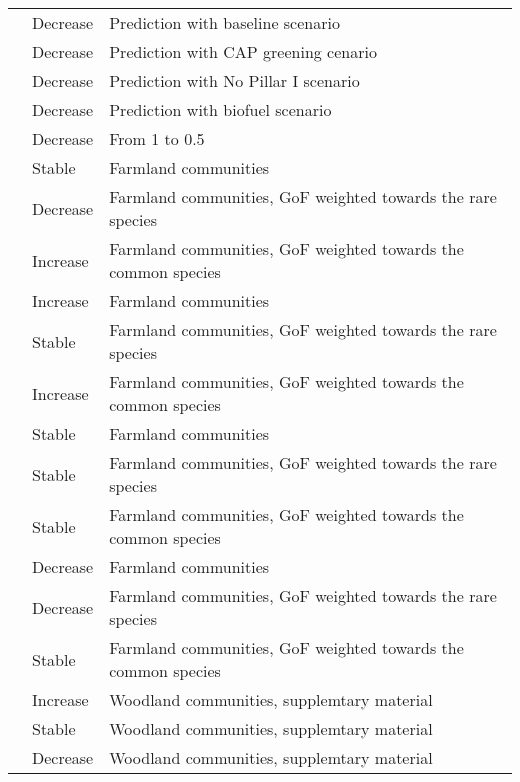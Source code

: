 \documentclass[
  12pt,
  oneside]{report}
\begin{document}
\begin{landscape}
\begin{longtable}[t]{ll>{\raggedright\arraybackslash}p{40em}}
\cite{chiron_forecasting_2013} & Decrease & Prediction with baseline scenario\\
\addlinespace
\cite{chiron_forecasting_2013} & Decrease & Prediction with CAP greening cenario\\
\cite{chiron_forecasting_2013} & Decrease & Prediction with No Pillar I scenario\\
\cite{chiron_forecasting_2013} & Decrease & Prediction with biofuel scenario\\
\cite{eglington_disentangling_2012} & Decrease & From 1 to 0.5\\
\cite{harrison_assessing_2014} & Stable & Farmland \vphantom{1} communities\\
\addlinespace
\cite{harrison_assessing_2014} & Decrease & Farmland communities, GoF weighted towards the rare \vphantom{1} species\\
\cite{harrison_assessing_2014} & Increase & Farmland communities, GoF weighted towards the common \vphantom{1} species\\
\cite{harrison_assessing_2014} & Increase & Farmland communities\\
\cite{harrison_assessing_2014} & Stable & Farmland communities, GoF weighted towards the rare \vphantom{1} species\\
\cite{harrison_assessing_2014} & Increase & Farmland communities, GoF weighted towards the common species\\
\addlinespace
\cite{harrison_assessing_2014} & Stable & Farmland communities\\
\cite{harrison_assessing_2014} & Stable & Farmland communities, GoF weighted towards the rare species\\
\cite{harrison_assessing_2014} & Stable & Farmland communities, GoF weighted towards the common \vphantom{1} species\\
\cite{harrison_assessing_2014} & Decrease & Farmland communities\\
\cite{harrison_assessing_2014} & Decrease & Farmland communities, GoF weighted towards the rare species\\
\addlinespace
\cite{harrison_assessing_2014} & Stable & Farmland communities, GoF weighted towards the common species\\
\cite{harrison_assessing_2014} & Increase & Woodland communities, supplemtary material\\
\cite{harrison_assessing_2014} & Stable & Woodland communities, supplemtary material\\
\cite{harrison_assessing_2014} & Decrease & Woodland communities, supplemtary material\\

\end{longtable}
\end{landscape}
\end{document}
